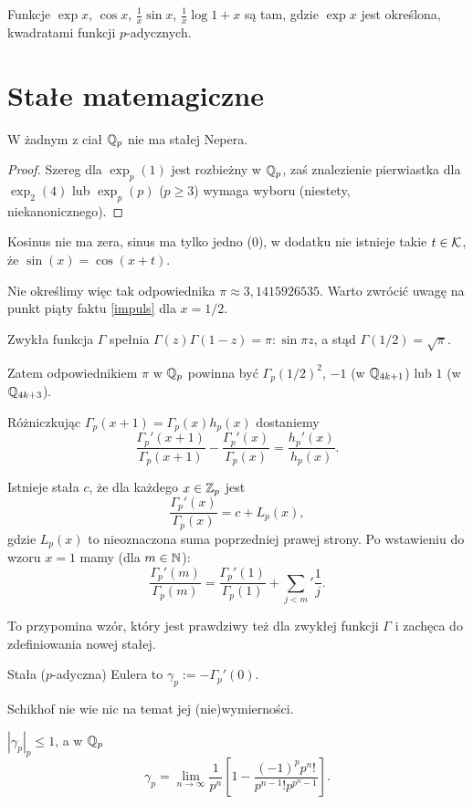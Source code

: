 \begin{fakt}
	Funkcje $\exp x$, $\cos x$, $\frac 1x\sin x$, $\frac 1 x \log 1 + x$ są tam, gdzie $\exp x$ jest określona, kwadratami funkcji $p$-adycznych. %
\end{fakt}

\section{Stałe matemagiczne}
\begin{fakt}
	W żadnym z ciał $\mathbb Q_p$ nie ma stałej Nepera.
\end{fakt}

\begin{proof}
Szereg dla $\exp_p(1)$ jest rozbieżny w $\mathbb Q_p$, zaś znalezienie pierwiastka dla $\exp_2(4)$ lub $\exp_p(p)$ ($p \ge 3$) wymaga  wyboru (niestety, niekanonicznego).
\end{proof}

\begin{fakt}
	Kosinus nie ma zera, sinus ma tylko jedno ($0$), w dodatku nie istnieje takie $t \in \mathcal K$, że $\sin (x) = \cos (x + t)$.
\end{fakt}

Nie określimy więc tak odpowiednika $\pi \approx 3,1415926535$.
Warto zwrócić uwagę na punkt piąty faktu \ref{impuls} dla $x = 1/2$.

\begin{fakt}
	Zwykła funkcja $\Gamma$ spełnia $\Gamma (z) \Gamma(1-z) = \pi : \sin \pi z$, a stąd $\Gamma (1/2) = \sqrt{\pi}$.
\end{fakt}

Zatem odpowiednikiem $\pi$ w $\mathbb Q_p$ powinna być $\Gamma_p(1/2)^2$, $-1$ (w $\mathbb Q_{4k+1}$) lub $1$ (w $\mathbb Q_{4k+3}$).

Różniczkując $\Gamma_p(x + 1) = \Gamma_p(x) h_p(x)$ dostaniemy
\[
	\frac{\Gamma_p'(x+1)}{\Gamma_p(x+1)} - \frac{\Gamma_p'(x)}{\Gamma_p(x)} = \frac{h_p'(x)}{h_p(x)}.
\]

Istnieje stała $c$, że dla każdego $x \in \mathbb Z_p$ jest
\[
	\frac{\Gamma_p'(x)}{\Gamma_p(x)} = c + L_p(x),
\]
gdzie $L_p(x)$ to nieoznaczona suma poprzedniej prawej strony.
Po wstawieniu do wzoru $x = 1$ mamy (dla $m \in \mathbb N$):
\[
	\frac{\Gamma_p'(m)}{\Gamma_p(m)} = \frac{\Gamma_p'(1)}{\Gamma_p(1)} + \sum_{j < m}' \frac 1 j.
\]

To przypomina wzór, który jest prawdziwy też dla zwykłej funkcji $\Gamma$ i zachęca do zdefiniowania nowej stałej.

\begin{definicja}
	Stała ($p$-adyczna) Eulera to $\gamma_p := - \Gamma_p'(0)$.
\end{definicja}

Schikhof nie wie nic na temat jej (nie)wymierności.

\begin{fakt}
	$|\gamma_p|_p \le 1$, a w $\mathbb Q_p$
	\[
		\gamma_p = \lim_{n \to \infty} \frac 1 {p^n} \left[1 - \frac{(-1)^p p^n!}{p^{n-1}! p^{p^n-1}} \right].
	\]
\end{fakt}